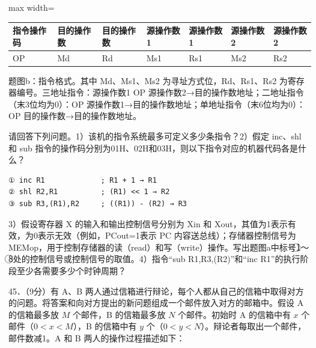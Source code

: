 \documentclass[UTF8,11pt]{ctexart}
\begin{document}
\begin{center}\begin{adjustbox}{max width=\linewidth}\begin{tabular}{|>{\raggedright\arraybackslash}p{\dimexpr(\linewidth-14\tabcolsep-8\arrayrulewidth)/7\relax}|>{\raggedright\arraybackslash}p{\dimexpr(\linewidth-14\tabcolsep-8\arrayrulewidth)/7\relax}|>{\raggedright\arraybackslash}p{\dimexpr(\linewidth-14\tabcolsep-8\arrayrulewidth)/7\relax}|>{\raggedright\arraybackslash}p{\dimexpr(\linewidth-14\tabcolsep-8\arrayrulewidth)/7\relax}|>{\raggedright\arraybackslash}p{\dimexpr(\linewidth-14\tabcolsep-8\arrayrulewidth)/7\relax}|>{\raggedright\arraybackslash}p{\dimexpr(\linewidth-14\tabcolsep-8\arrayrulewidth)/7\relax}|>{\raggedright\arraybackslash}p{\dimexpr(\linewidth-14\tabcolsep-8\arrayrulewidth)/7\relax}|}\hline
指令操作码 & 目的操作数 & 目的操作数 & 源操作数1 & 源操作数1 & 源操作数2 & 源操作数2\\\hline
OP & Md & Rd & Ms1 & Rs1 & Ms2 & Rs2\\\hline\end{tabular}\end{adjustbox}\end{center}

题图b：指令格式。其中 Md、Ms1、Ms2 为寻址方式位，Rd、Rs1、Rs2 为寄存器编号。三地址指令：源操作数1 OP 源操作数2→目的操作数地址；二地址指令（末3位均为0）：OP 源操作数1→目的操作数地址；单地址指令（末6位均为0）：OP 目的操作数→目的操作数地址。


请回答下列问题。1）该机的指令系统最多可定义多少条指令？2）假定 inc、shl 和 sub 指令的操作码分别为01H、02H和03H，则以下指令对应的机器代码各是什么？


\begin{Verbatim}[breaklines,breakanywhere,fontsize=\small]
① inc R1             ; R1 + 1 → R1
② shl R2,R1          ; (R1) << 1 → R2
③ sub R3,(R1),R2     ; ((R1)) - (R2) → R3
\end{Verbatim}

3）假设寄存器 X 的输入和输出控制信号分别为 Xin 和 Xout，其值为1表示有效，为0表示无效（例如，PCout=1表示 PC 内容送总线）；存储器控制信号为 MEMop，用于控制存储器的读（read）和写（write）操作。写出题图a中标号\textcircled{1}～\textcircled{8}处的控制信号或控制信号的取值。4）指令“sub R1,R3,(R2)”和“inc R1”的执行阶段至少各需要多少个时钟周期？


45．（9分）有 A、B 两人通过信箱进行辩论，每个人都从自己的信箱中取得对方的问题。将答案和向对方提出的新问题组成一个邮件放入对方的邮箱中。假设 A 的信箱最多放 \(\displaystyle M\) 个邮件，B 的信箱最多放 \(\displaystyle N\) 个邮件。初始时 A 的信箱中有 \(\displaystyle x\) 个邮件（\(\displaystyle 0<x<M\)），B 的信箱中有 \(\displaystyle y\) 个（\(\displaystyle 0<y<N\)）。辩论者每取出一个邮件，邮件数减1。A 和 B 两人的操作过程描述如下：
\end{document}
